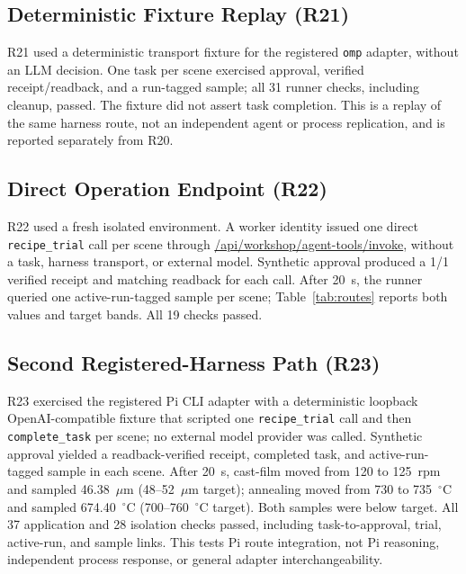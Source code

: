 \subsection{Deterministic Fixture Replay (R21)}
R21 used a deterministic transport fixture for the registered \texttt{omp}
adapter, without an LLM decision. One task per scene exercised approval,
verified receipt/readback, and a run-tagged sample; all 31 runner checks,
including cleanup, passed. The fixture did not assert task completion. This is
a replay of the same harness route, not an independent agent or process
replication, and is reported separately from R20.

\subsection{Direct Operation Endpoint (R22)}
R22 used a fresh isolated environment. A worker identity issued one direct
\texttt{recipe\_}\allowbreak\texttt{trial} call per scene through
\url{/api/workshop/agent-tools/invoke}, without a task, harness transport,
or external model. Synthetic approval produced a 1/1 verified receipt and
matching readback for each call. After 20~s, the runner queried one
active-run-tagged sample per scene; Table~\ref{tab:routes} reports both
values and target bands. All 19 checks passed.

\subsection{Second Registered-Harness Path (R23)}
R23 exercised the registered Pi CLI adapter with a deterministic loopback
OpenAI-compatible fixture that scripted one \texttt{recipe\_trial} call and
then \texttt{complete\_task} per scene; no external model provider was called.
Synthetic approval yielded a readback-verified receipt, completed task,
and active-run-tagged sample in each scene. After 20~s, cast-film moved from
120 to 125~rpm and sampled 46.38~$\mu$m (48--52~$\mu$m target); annealing
moved from 730 to 735~$^{\circ}$C and sampled 674.40~$^{\circ}$C
(700--760~$^{\circ}$C target). Both samples were below target. All 37
application and 28 isolation checks passed, including task-to-approval, trial,
active-run, and sample links. This tests Pi route integration, not Pi reasoning,
independent process response, or general adapter interchangeability.

